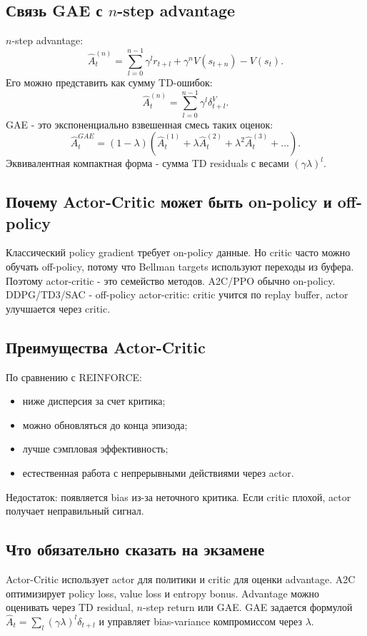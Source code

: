 \documentclass[11pt,a4paper]{article}
\newcommand{\1}{\mathbf{1}}
\begin{document}
\subsection*{Связь GAE с $n$-step advantage}
$n$-step advantage:
\[
    \hat A_t^{(n)}=\sum_{l=0}^{n-1}\gamma^l r_{t+l}+\gamma^n V(s_{t+n})-V(s_t).
\]
Его можно представить как сумму TD-ошибок:
\[
    \hat A_t^{(n)}=\sum_{l=0}^{n-1}\gamma^l\delta_{t+l}^V.
\]
GAE - это экспоненциально взвешенная смесь таких оценок:
\[
    \hat A_t^{GAE}=(1-\lambda)\left(\hat A_t^{(1)}+\lambda\hat A_t^{(2)}+\lambda^2\hat A_t^{(3)}+\dots\right).
\]
Эквивалентная компактная форма - сумма TD residuals с весами $(\gamma\lambda)^l$.

\subsection*{Почему Actor-Critic может быть on-policy и off-policy}
Классический policy gradient требует on-policy данные. Но critic часто можно обучать off-policy, потому что Bellman targets используют переходы из буфера. Поэтому actor-critic - это семейство методов. A2C/PPO обычно on-policy. DDPG/TD3/SAC - off-policy actor-critic: critic учится по replay buffer, actor улучшается через critic.

\subsection*{Преимущества Actor-Critic}
По сравнению с REINFORCE:
\begin{itemize}
    \item ниже дисперсия за счет критика;
    \item можно обновляться до конца эпизода;
    \item лучше сэмпловая эффективность;
    \item естественная работа с непрерывными действиями через actor.
\end{itemize}
Недостаток: появляется bias из-за неточного критика. Если critic плохой, actor получает неправильный сигнал.

\subsection*{Что обязательно сказать на экзамене}
Actor-Critic использует actor для политики и critic для оценки advantage. A2C оптимизирует policy loss, value loss и entropy bonus. Advantage можно оценивать через TD residual, $n$-step return или GAE. GAE задается формулой $\hat A_t=\sum_l(\gamma\lambda)^l\delta_{t+l}$ и управляет bias-variance компромиссом через $\lambda$.
\end{document}
